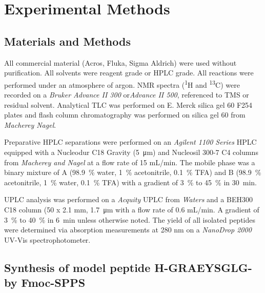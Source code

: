 \chapter{Experimental Methods}
\ifpdf
    \graphicspath{{Experimental/ExperimentalFigs/PNG/}{Experimental/ExperimentalFigs/PDF/}{Experimental/ExperimentalFigs/}}
\else
    \graphicspath{{Experimental/ExperimentalFigs/EPS/}{Experimental/ExperimentalFigs/}}
\fi


\section*{Materials and Methods}

All commercial material (Acros, Fluka, Sigma Aldrich) were used without purification. All solvents were reagent grade or HPLC grade. All reactions were performed under an atmosphere of argon. NMR spectra (\textsuperscript{1}H and \textsuperscript{13}C) were recorded on a \textit{Bruker Advance II 300} or\textit{Advance II 500}, referenced to TMS or residual solvent. Analytical TLC was performed on E. Merck silica gel 60 F254 plates and flash column chromatography was performed on silica gel 60 from \textit{Macherey Nagel}.

Preparative HPLC separations were performed on an \textit{Agilent 1100 Series} HPLC equipped with a Nucleodur C18 Gravity (\SI{5}{\micro\meter}) and Nucleosil 300-7 C4 columns from \textit{Macherey and Nagel} at a flow rate of 15 mL/min. The mobile phase was a binary mixture of A (\SI{98.9}{\percent} water, \SI{1}{\percent} acetonitrile, \SI{0.1}{\percent} TFA) and B (\SI{98.9}{\percent} acetonitrile, \SI{1}{\percent} water, \SI{0.1}{\percent} TFA) with a gradient of \SI{3}{\percent} to \SI{45}{\percent} in \SI{30}{\minute}.

UPLC analysis was performed on a \textit{Acquity} UPLC from \textit{Waters} and a BEH300 C18 column (50 x 2.1 mm, \SI{1.7}{\micro\metre} with a flow rate of 0.6 mL/min. A gradient of \SI{3}{\percent} to \SI{40}{\percent} in \SI{6}{\minute} unless otherwise noted. The yield of all isolated peptides were determined via absorption measurements at 280 nm on a \textit{NanoDrop 2000} UV-Vis spectrophotometer.


\section{Synthesis of model peptide H-GRAEYSGLG- by Fmoc-SPPS}

